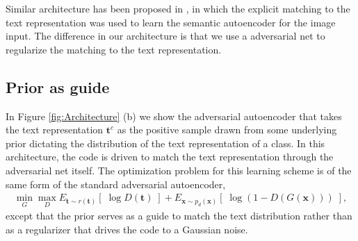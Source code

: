 \documentclass{article}
\newcommand{\bb}[1]{\boldsymbol{#1}}
\begin{document}



	Similar architecture has been proposed in \cite{kodirov2017semantic}, in which the explicit matching to the text representation was used to learn the semantic autoencoder for the image input. The difference in our architecture is that we use a adversarial net to regularize the matching to the text representation.




\subsection{Prior as guide}
\label{subsec:TextPrior}
	
	In Figure \ref{fig:Architecture} (b) we show the adversarial autoencoder that takes the text representation $\bb{t}^c$ as the positive sample drawn from some underlying prior dictating the distribution of the text representation of a class. In this architecture, the code is driven to match the text representation through the adversarial net itself. The optimization problem for this learning scheme is of the same form of the standard adversarial autoencoder,
	\begin{align}
		\min_{G} \max_D E_{\bb{t} \sim r(\bb{t})}\left[\; \log D(\bb{t}) \;\right] + E_{\bb{x} \sim p_d(\bb{x})}\left[\; \log( 1 - D(G(\bb{x})) ) \;\right],
	\end{align}
	except that the prior serves as a guide to match the text distribution rather than as a regularizer that drives the code to a Gaussian noise.










	
\end{document}
